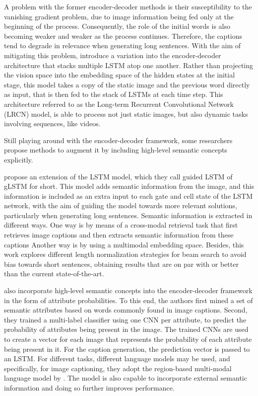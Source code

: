 A problem with the former encoder-decoder methods is their susceptibility to the vanishing gradient problem, due to image information being fed only at the beginning of the process. Consequently, the role of the initial words is also becoming weaker and weaker as the process continues. Therefore, the captions tend to degrade in relevance when generating long sentences. With the aim of mitigating this problem, \citet{Donahue2015} introduce a variation into the encoder-decoder architecture that stacks multiple LSTM atop one another. Rather than projecting the vision space into the embedding space of the hidden states at the initial stage, this model takes a copy of the static image and the previous word directly as input, that is then fed to the stack of LSTMs at each time step. This architecture referred to as the Long-term Recurrent Convolutional Network (LRCN) model, is able to process not just static images, but also dynamic tasks involving sequences, like videos.

Still playing around with the encoder-decoder framework, some researchers propose methods to augment it by including high-level semantic concepts explicitly. 

\citet{Jia2015} propose an extension of the LSTM model, which they call guided LSTM of gLSTM for short. This model adds semantic information from the image, and this information is included as an extra input to each gate and cell state of the LSTM network, with the aim of guiding the model towards more relevant solutions, particularly when generating long sentences. Semantic information is extracted in different ways. One way is by means of a cross-modal retrieval task that first retrieves image captions and then extracts semantic information from these captions Another way is by using a multimodal embedding space. Besides, this work explores different length normalization strategies for beam search to avoid bias towards short sentences, obtaining results that are on par with or better than the current state-of-the-art.

\citet{Wu2016} also incorporate high-level semantic concepts into the encoder-decoder framework in the form of attribute probabilities. To this end, the authors first mined a set of semantic attributes based on words commonly found in image captions. Second, they trained a multi-label classifier using one CNN per attribute, to predict the probability of attributes being present in the image. The trained CNNs are used to create a vector for each image that represents the probability of each attribute being present in it. For the caption generation, the prediction vector is passed to an LSTM. For different tasks, different language models may be used, and specifically, for image captioning, they adopt the region-based multi-modal language model by \citet{Vinyals2015}. The model is also capable to incorporate external semantic information and doing so further improves performance.

